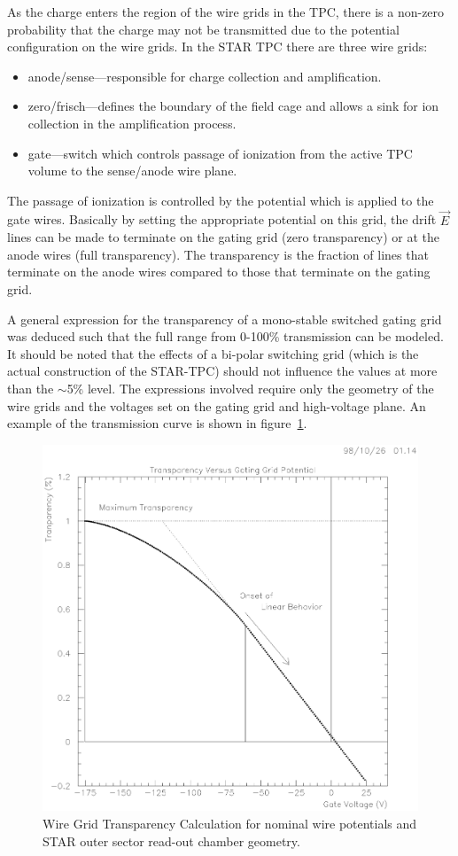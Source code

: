\documentclass[twoside]{article}
\begin{document}
As the charge enters the region of the wire grids in the
TPC, there is a non-zero probability that the charge may not
be transmitted due to the potential configuration on the wire
grids.  In the STAR TPC there are three wire grids:
\begin{itemize}
   \item anode/sense---responsible for charge collection and
     amplification.
   \item zero/frisch---defines the boundary of the field cage and
     allows a sink for ion collection in the amplification process.
   \item gate---switch which controls passage of ionization from
     the active TPC volume to the sense/anode wire plane.
\end{itemize}
The passage of ionization is controlled by the potential which
is applied to the gate wires.  Basically by setting the appropriate
potential on this grid, the drift $\vec{E}$ lines can be made to
terminate on the gating grid (zero transparency) or at the anode
wires (full transparency).  The transparency is the fraction of
lines that terminate on the anode wires compared to those that
terminate on the gating grid.

A general expression for the transparency of a mono-stable switched
gating grid was deduced such that
the full range from 0-100\% transmission can be
modeled.  It should be noted that the effects of a bi-polar switching
grid (which is the actual construction of the STAR-TPC) should not
influence the values at more than the $\sim$5\% level.
The expressions involved require only the geometry of the
wire grids and the voltages set on the gating grid
and high-voltage plane.  An example of the transmission curve
is shown in figure~\ref{fig:gridTransparency}.
\begin{figure}[htb]
\begin{center}
\includegraphics[bbllx=14pt,bblly=137pt,bburx=569pt,bbury=701pt,width=.55\textwidth]{./pics/gridTransparency.ps}
\caption{Wire Grid Transparency Calculation for nominal wire potentials
  and STAR outer sector read-out chamber geometry.}
\label{fig:gridTransparency}
\end{center}
\end{figure}
\end{document}
